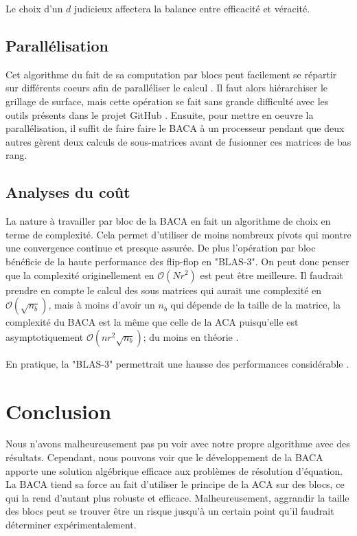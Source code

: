 \documentclass[10pt]{SelfArx} %
\begin{document}
Le choix d'un $d$ judicieux affectera la balance entre efficacité et véracité. 

\subsection{Parallélisation}
Cet algorithme du fait de sa computation par blocs peut facilement se répartir sur différents coeurs afin de paralléliser le calcul \cite{liu_parallel_2020}. Il faut alors hiérarchiser le grillage de surface, mais cette opération se fait sans grande difficulté avec les outils présents dans le projet GitHub \cite{git_proj}. Ensuite, pour mettre en oeuvre la parallélisation, il suffit de faire faire le BACA à un processeur pendant que deux autres gèrent deux calculs de sous-matrices avant de fusionner ces matrices de bas rang.

\subsection{Analyses du coût}
La nature à travailler par bloc de la BACA en fait un algorithme de choix en terme de complexité. Cela permet d'utiliser de moins nombreux pivots qui montre une convergence continue et presque assurée. De plus l'opération par bloc bénéficie de la haute performance des flip-flop en "BLAS-3".
On peut donc penser que la complexité originellement en $\mathcal{O}(Nr^2)$ est peut être meilleure. Il faudrait prendre en compte le calcul des sous matrices qui aurait une complexité en $\mathcal{O}(\sqrt{n_b})$, mais à moins d'avoir un $n_b$ qui dépende de la taille de la matrice, la complexité du BACA est la même que celle de la ACA puisqu'elle est asymptotiquement $\mathcal{O}(nr^2\sqrt{n_b})$; du moins en théorie \cite{liu_parallel_2020}.

En pratique, la "BLAS-3" permettrait une hausse des performances considérable \cite{liu_parallel_2020}.


\section*{Conclusion}


Nous n'avons malheureusement pas pu voir avec notre propre algorithme avec des résultats. Cependant, nous pouvons voir que le développement de la BACA apporte une solution algébrique efficace aux problèmes de résolution d'équation. La BACA tiend sa force au fait d'utiliser le principe de la ACA sur des blocs, ce qui la rend d'autant plus robuste et efficace. Malheureusement, aggrandir la taille des blocs peut se trouver être un risque jusqu'à un certain point qu'il faudrait déterminer expérimentalement.
\end{document}
